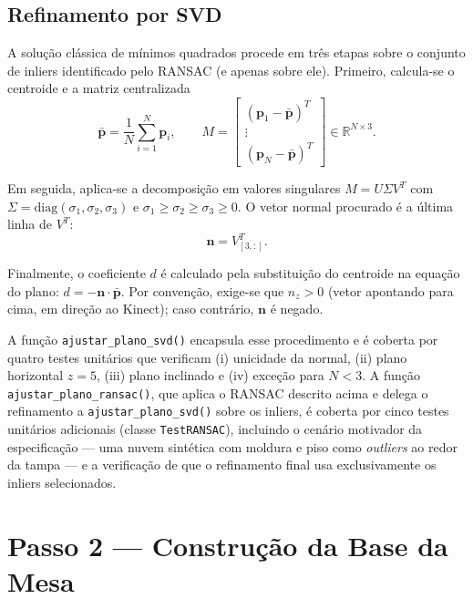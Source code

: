 \subsection{Refinamento por SVD}

A solução clássica de mínimos quadrados procede em três etapas sobre o
conjunto de inliers identificado pelo RANSAC (e apenas sobre ele).
Primeiro, calcula-se o centroide e a matriz centralizada
\begin{equation}
\bar{\mathbf{p}} = \frac{1}{N} \sum_{i=1}^{N} \mathbf{p}_i,
\qquad
M = \begin{bmatrix}
(\mathbf{p}_1 - \bar{\mathbf{p}})^{T} \\
\vdots \\
(\mathbf{p}_N - \bar{\mathbf{p}})^{T}
\end{bmatrix} \in \mathbb{R}^{N \times 3}.
\end{equation}

Em seguida, aplica-se a decomposição em valores singulares
$M = U \Sigma V^{T}$ com $\Sigma = \text{diag}(\sigma_1, \sigma_2,
\sigma_3)$ e $\sigma_1 \geq \sigma_2 \geq \sigma_3 \geq 0$. O vetor
normal procurado é a última linha de $V^{T}$:
\begin{equation}
\mathbf{n} = V^{T}_{[3,:]}.
\end{equation}

Finalmente, o coeficiente $d$ é calculado pela substituição do
centroide na equação do plano: $d = -\mathbf{n} \cdot \bar{\mathbf{p}}$.
Por convenção, exige-se que $n_z > 0$ (vetor apontando para cima, em
direção ao Kinect); caso contrário, $\mathbf{n}$ é negado.

A função \texttt{ajustar\_plano\_svd()} encapsula esse procedimento e é
coberta por quatro testes unitários que verificam (i) unicidade da
normal, (ii) plano horizontal $z = 5$, (iii) plano inclinado e
(iv) exceção para $N < 3$. A função \texttt{ajustar\_plano\_ransac()},
que aplica o RANSAC descrito acima e delega o refinamento a
\texttt{ajustar\_plano\_svd()} sobre os inliers, é coberta por cinco
testes unitários adicionais (classe \texttt{TestRANSAC}), incluindo o
cenário motivador da especificação — uma nuvem sintética com moldura e
piso como \textit{outliers} ao redor da tampa — e a verificação de que
o refinamento final usa exclusivamente os inliers selecionados.

\section{Passo 2 — Construção da Base da Mesa}
\label{sec:passo2}

